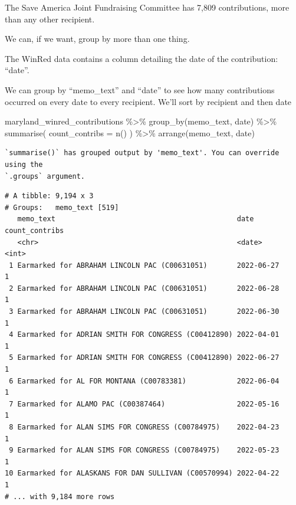 \documentclass[
  letterpaper,
  DIV=11,
  numbers=noendperiod]{scrreprt}
\newenvironment{Shaded}{\begin{snugshade}}{\end{snugshade}}
\newcommand{\AttributeTok}[1]{\textcolor[rgb]{0.40,0.45,0.13}{#1}}
\newcommand{\FunctionTok}[1]{\textcolor[rgb]{0.28,0.35,0.67}{#1}}
\newcommand{\NormalTok}[1]{\textcolor[rgb]{0.00,0.23,0.31}{#1}}
\newcommand{\SpecialCharTok}[1]{\textcolor[rgb]{0.37,0.37,0.37}{#1}}
\begin{document}
The Save America Joint Fundraising Committee has 7,809 contributions,
more than any other recipient.

We can, if we want, group by more than one thing.

The WinRed data contains a column detailing the date of the
contribution: ``date''.

We can group by ``memo\_text'' and ``date'' to see how many
contributions occurred on every date to every recipient. We'll sort by
recipient and then date

\begin{Shaded}
\begin{Highlighting}[]
\NormalTok{maryland\_winred\_contributions }\SpecialCharTok{\%\textgreater{}\%}
  \FunctionTok{group\_by}\NormalTok{(memo\_text, date) }\SpecialCharTok{\%\textgreater{}\%}
  \FunctionTok{summarise}\NormalTok{(}
    \AttributeTok{count\_contribs =} \FunctionTok{n}\NormalTok{()}
\NormalTok{  ) }\SpecialCharTok{\%\textgreater{}\%}
  \FunctionTok{arrange}\NormalTok{(memo\_text, date)}
\end{Highlighting}
\end{Shaded}

\begin{verbatim}
`summarise()` has grouped output by 'memo_text'. You can override using the
`.groups` argument.
\end{verbatim}

\begin{verbatim}
# A tibble: 9,194 x 3
# Groups:   memo_text [519]
   memo_text                                           date       count_contribs
   <chr>                                               <date>              <int>
 1 Earmarked for ABRAHAM LINCOLN PAC (C00631051)       2022-06-27              1
 2 Earmarked for ABRAHAM LINCOLN PAC (C00631051)       2022-06-28              1
 3 Earmarked for ABRAHAM LINCOLN PAC (C00631051)       2022-06-30              1
 4 Earmarked for ADRIAN SMITH FOR CONGRESS (C00412890) 2022-04-01              1
 5 Earmarked for ADRIAN SMITH FOR CONGRESS (C00412890) 2022-06-27              1
 6 Earmarked for AL FOR MONTANA (C00783381)            2022-06-04              1
 7 Earmarked for ALAMO PAC (C00387464)                 2022-05-16              1
 8 Earmarked for ALAN SIMS FOR CONGRESS (C00784975)    2022-04-23              1
 9 Earmarked for ALAN SIMS FOR CONGRESS (C00784975)    2022-05-23              1
10 Earmarked for ALASKANS FOR DAN SULLIVAN (C00570994) 2022-04-22              1
# ... with 9,184 more rows
\end{verbatim}
\end{document}
